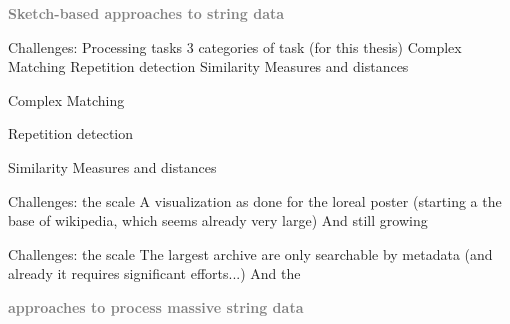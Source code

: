 \begin{frame}
    \vfill
    \bigskip
    \begin{center}
        \textbf{\textcolor{gray}{Sketch-based approaches to   string data}}
    \end{center}
    \vfill
\end{frame}

\begin{frame}{Challenges: Processing tasks}
3 categories of task (for this thesis)
Complex Matching
Repetition detection
Similarity Measures and distances
\end{frame}

 \begin{frame}{Complex Matching}
    
 \end{frame}

 \begin{frame}{Repetition detection}
    
 \end{frame}

 \begin{frame}{Similarity Measures and distances}
    
 \end{frame}

\begin{frame}{Challenges: the scale}
    A visualization as done for the loreal poster (starting a the base of wikipedia, which seems already very large)
    And still growing
\end{frame}

\begin{frame}{Challenges: the scale}
    The largest archive are only searchable by metadata (and already it requires significant efforts...)
    And the 
\end{frame}

\begin{frame}
    \vfill
    \bigskip
    \begin{center}
        \textbf{\textcolor{gray}{ approaches to process massive string data}}
    \end{center}
    \vfill
\end{frame}

